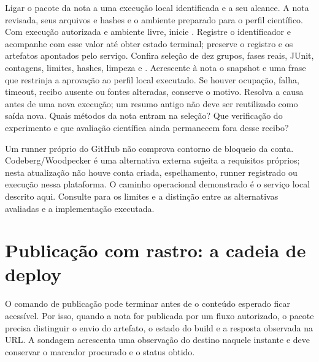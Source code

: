\praticacore
{Ligar o pacote da nota a uma execução local identificada e a seu alcance.}
{A nota revisada, seus arquivos e hashes e o ambiente preparado para o perfil científico.}
{Com execução autorizada e ambiente livre, inicie . Registre o identificador e acompanhe  com esse valor até obter estado terminal; preserve o registro e os artefatos apontados pelo serviço.}
{Confira seleção de dez grupos, fases reais, JUnit, contagens, limites, hashes, limpeza e . Acrescente à nota o snapshot e uma frase que restrinja a aprovação ao perfil local executado.}
{Se houver ocupação, falha, timeout, recibo ausente ou fontes alteradas, conserve o motivo. Resolva a causa antes de uma nova execução; um resumo antigo não deve ser reutilizado como saída nova.}
{Quais métodos da nota entram na seleção? Que verificação do experimento e que avaliação científica ainda permanecem fora desse recibo?}

\begin{limite}
Um runner próprio do GitHub não comprova contorno de bloqueio da conta.
Codeberg/Woodpecker é uma alternativa externa sujeita a requisitos próprios;
nesta atualização não houve conta criada, espelhamento, runner registrado
ou execução nessa plataforma. O caminho operacional demonstrado é o serviço
local descrito aqui. Consulte
 para os limites e a
distinção entre as alternativas avaliadas e a implementação executada.
\end{limite}

\section{Publicação com rastro: a cadeia de deploy}

\begin{descricao}
O comando de publicação pode terminar antes de o conteúdo esperado ficar
acessível. Por isso, quando a nota for publicada por um fluxo autorizado, o
pacote precisa distinguir o envio do artefato, o estado do build e a resposta
observada na URL. A sondagem acrescenta uma observação do destino naquele
instante e deve conservar o marcador procurado e o status obtido.
\end{descricao}

